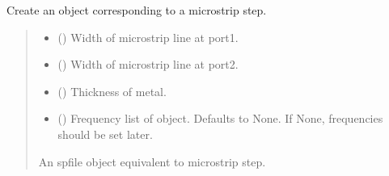 \documentclass[letterpaper,10pt,english]{sphinxmanual}
\begin{document}
\begin{fulllineitems}
\begin{fulllineitems}
\label{\detokenize{touchstone:touchstone.spfile.microstripstep}}
\pysigstartsignatures
{}
\pysigstopsignatures
\sphinxAtStartPar
Create an  object corresponding to a microstrip step.
\begin{quote}\begin{description}
\begin{itemize}
\item {}
\sphinxAtStartPar
{} () \textendash{} Width of microstrip line at port\sphinxhyphen{}1.

\item {}
\sphinxAtStartPar
{} () \textendash{} Width of microstrip line at port\sphinxhyphen{}2.

\item {}
\sphinxAtStartPar
{} () \textendash{} Thickness of metal.

\item {}
\sphinxAtStartPar
{} (\sphinxstyleliteralemphasis{\sphinxupquote{, }}) \textendash{} Frequency list of object. Defaults to None. If None, frequencies should be set later.

\end{itemize}

\sphinxAtStartPar
An spfile object equivalent to microstrip step.

\sphinxAtStartPar
{\hyperref[\detokenize{touchstone:touchstone.spfile}]{}}

\end{description}\end{quote}

\end{fulllineitems}


\end{fulllineitems}
\end{document}
